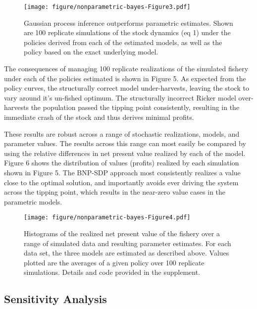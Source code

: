 \documentclass[author-year, review]{elsarticle} %
\makeatletter
\def\maxwidth{\ifdim\Gin@nat@width>\linewidth\linewidth
\else\Gin@nat@width\fi}
\let\Oldincludegraphics\includegraphics
\renewcommand{\includegraphics}[1]{\Oldincludegraphics[width=\maxwidth]{#1}}
\makeatother
\begin{document}
\begin{figure}[htbp]
\centering
\texttt{[image: figure/nonparametric-bayes-Figure3.pdf]}
\caption{Gaussian process inference outperforms parametric estimates.
Shown are 100 replicate simulations of the stock dynamics (eq 1) under
the policies derived from each of the estimated models, as well as the
policy based on the exact underlying model.}
\end{figure}

The consequences of managing 100 replicate realizations of the simulated
fishery under each of the policies estimated is shown in Figure 5. As
expected from the policy curves, the structurally correct model
under-harvests, leaving the stock to vary around it's un-fished optimum.
The structurally incorrect Ricker model over-harvests the population
passed the tipping point consistently, resulting in the immediate crash
of the stock and thus derives minimal profits.

These results are robust across a range of stochastic realizations,
models, and parameter values. The results across this range can most
easily be compared by using the relative differences in net present
value realized by each of the model. Figure 6 shows the distribution of
values (profits) realized by each simulation shown in Figure 5. The
BNP-SDP approach most consistently realizes a value close to the optimal
solution, and importantly avoids ever driving the system across the
tipping point, which results in the near-zero value cases in the
parametric models.

\begin{figure}[htbp]
\centering
\texttt{[image: figure/nonparametric-bayes-Figure4.pdf]}
\caption{Histograms of the realized net present value of the fishery
over a range of simulated data and resulting parameter estimates. For
each data set, the three models are estimated as described above. Values
plotted are the averages of a given policy over 100 replicate
simulations. Details and code provided in the supplement.}
\end{figure}

\subsection{Sensitivity Analysis}\label{sensitivity-analysis}
\end{document}
